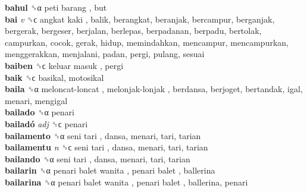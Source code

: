 \textbf{bahul} ␝α   peti barang , but  \\
\textbf{bai} \emph{v}  ␝ϲ   angkat kaki , balik, berangkat, beranjak, bercampur, berganjak, bergerak, bergeser, berjalan, berlepas, berpadanan, berpadu, bertolak, campurkan, cocok, gerak, hidup, memindahkan, mencampur, mencampurkan, menggerakkan, menjalani, padan, pergi, pulang, sesuai  \\
\textbf{baiben} ␝ϲ   keluar masuk , pergi  \\
\textbf{baik} ␝ϲ  basikal, motosikal  \\
\textbf{baila} ␝α   meloncat-loncat ,  melonjak-lonjak , berdansa, berjoget, bertandak, igal, menari, mengigal  \\
\textbf{bailado} ␝α  penari  \\
\textbf{bailadó} \emph{adj}  ␝ϲ  penari  \\
\textbf{bailamento} ␝α   seni tari , dansa, menari, tari, tarian  \\
\textbf{bailamentu} \emph{n}  ␝ϲ   seni tari , dansa, menari, tari, tarian  \\
\textbf{bailando} ␝α   seni tari , dansa, menari, tari, tarian  \\
\textbf{bailarin} ␝α   penari balet wanita ,  penari balet , ballerina  \\
\textbf{bailarina} ␝α   penari balet wanita ,  penari balet , ballerina, penari  \\
